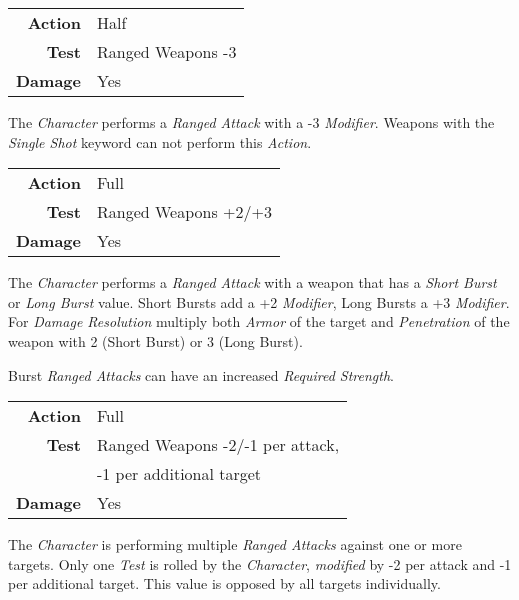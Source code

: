 
\begin{tabular}{rl}
    \textbf{Action} & Half              \\
    \textbf{Test}   & Ranged Weapons -3 \\
    \textbf{Damage} & Yes               \\
\end{tabular}

\hfill

The \emph{Character} performs a \emph{Ranged Attack} with a -3 \emph{Modifier}.
Weapons with the \emph{Single Shot} keyword can not perform this \emph{Action}.



\begin{tabular}{rl}
    \textbf{Action} & Full                 \\
    \textbf{Test}   & Ranged Weapons +2/+3 \\
    \textbf{Damage} & Yes                  \\
\end{tabular}

\hfill

The \emph{Character} performs a \emph{Ranged Attack} with a weapon that has a
\emph{Short Burst} or \emph{Long Burst} value. Short Bursts add a +2
\emph{Modifier}, Long Bursts a +3 \emph{Modifier}. For \emph{Damage Resolution}
multiply both \emph{Armor} of the target and \emph{Penetration} of the weapon
with 2 (Short Burst) or 3 (Long Burst).

Burst \emph{Ranged Attacks} can have an increased \emph{Required Strength}.


\begin{tabular}{rl}
    \textbf{Action} & Full                             \\
    \textbf{Test}   & Ranged Weapons -2/-1 per attack, \\
                    & -1 per additional target         \\
    \textbf{Damage} & Yes                              \\
\end{tabular}

\hfill

The \emph{Character} is performing multiple \emph{Ranged Attacks} against one or
more targets. Only one \emph{Test} is rolled by the \emph{Character},
\emph{modified} by -2 per attack and -1 per additional target.
This value is opposed by all targets individually.

